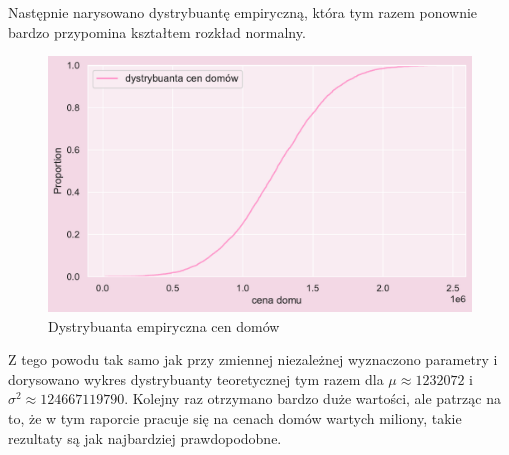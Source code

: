 \documentclass{article}
\begin{document}
\noindent Następnie narysowano dystrybuantę empiryczną, która tym razem ponownie bardzo przypomina kształtem rozkład normalny. 
    \begin{figure}[H]
	\begin{center}
		\includegraphics[scale=0.68]{images/price_dystr1.pdf}
		\caption{Dystrybuanta empiryczna cen domów}
		\label{denistyx}
	\end{center}
	\end{figure}
\noindent Z tego powodu tak samo jak przy zmiennej niezależnej wyznaczono parametry i dorysowano wykres dystrybuanty teoretycznej tym razem dla $\mu \approx 1232072 $ i $\sigma^2 \approx 124667119790 $. Kolejny raz otrzymano bardzo duże wartości, ale patrząc na to, że w tym raporcie pracuje się na cenach domów wartych miliony, takie rezultaty są jak najbardziej prawdopodobne.
\end{document}
